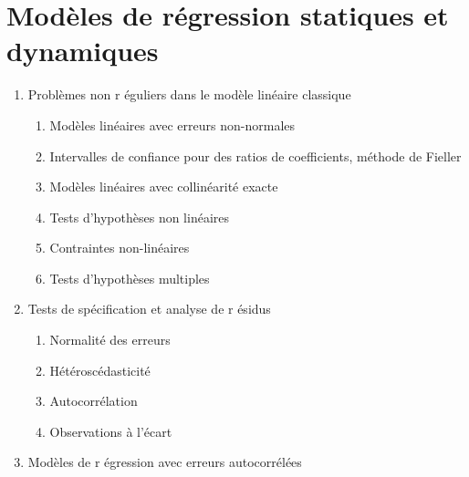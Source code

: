 \documentclass[titlepage,11pt,amstex]{article}
\begin{document}
\section{\textbf{Mod\`{e}les de r\'{e}gression statiques et dynamiques}}

\begin{enumerate}
\item \label{Nonregular problems in linear regression}Probl\`{e}mes non r%
\'{e}guliers dans le mod\`{e}le lin\'{e}aire classique

\begin{enumerate}
\item \label{Linear models with non-normal errors}Mod\`{e}les lin\'{e}aires
avec erreurs non-normales

\item \label{Ratios of coefficients}Intervalles de confiance pour des ratios
de coefficients, m\'{e}thode de Fieller

\item \label{Linear models with collinearity}Mod\`{e}les lin\'{e}aires avec
collin\'{e}arit\'{e} exacte

\item \label{Nonlinear hypotheses}Tests d'hypoth\`{e}ses non lin\'{e}aires

\item \label{Nonlinear constraints}Contraintes non-lin\'{e}aires

\item \label{Multiple hypotheses}Tests d'hypoth\`{e}ses multiples
\end{enumerate}

\item \label{Specification tests}Tests de sp\'{e}cification et analyse de r%
\'{e}sidus

\begin{enumerate}
\item \label{Normality tests}Normalit\'{e} des erreurs

\item \label{Heteroskedasticity tests}H\'{e}t\'{e}rosc\'{e}dasticit\'{e}

\item \label{Autocorrelation tests}Autocorr\'{e}lation

\item \label{Outlier tests}Observations \`{a} l'\'{e}cart
\end{enumerate}

\item \label{Linear regressions with autocorrelated errors}Mod\`{e}les de r%
\'{e}gression avec erreurs autocorr\'{e}l\'{e}es


\end{enumerate}
\end{document}
